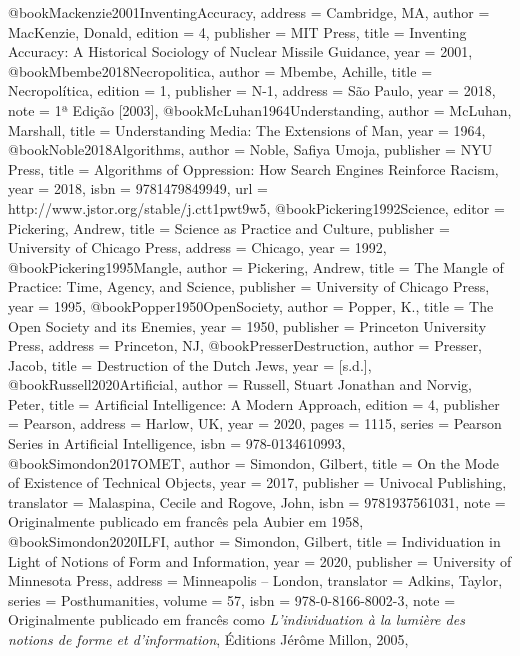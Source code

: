 @book{Mackenzie2001InventingAccuracy,
  address   = {Cambridge, MA},
  author    = {MacKenzie, Donald},
  edition   = {4},
  publisher = {MIT Press},
  title     = {{Inventing Accuracy: A Historical Sociology of Nuclear Missile Guidance}},
  year      = {2001},
}
@book{Mbembe2018Necropolitica,
  author    = {Mbembe, Achille},
  title     = {{Necropolítica}},
  edition   = {1},
  publisher = {N-1},
  address   = {São Paulo},
  year      = {2018},
  note      = {1ª Edição [2003]},
}
@book{McLuhan1964Understanding,
  author    = {McLuhan, Marshall},
  title     = {{Understanding Media: The Extensions of Man}},
  year      = {1964},
}
@book{Noble2018Algorithms,
  author    = {Noble, Safiya Umoja},
  publisher = {NYU Press},
  title     = {{Algorithms of Oppression: How Search Engines Reinforce Racism}},
  year      = {2018},
  isbn      = {9781479849949},
  url       = {http://www.jstor.org/stable/j.ctt1pwt9w5},
}
@book{Pickering1992Science,
  editor    = {Pickering, Andrew},
  title     = {{Science as Practice and Culture}},
  publisher = {University of Chicago Press},
  address   = {Chicago},
  year      = {1992},
}
@book{Pickering1995Mangle,
  author    = {Pickering, Andrew},
  title     = {{The Mangle of Practice: Time, Agency, and Science}},
  publisher = {University of Chicago Press},
  year      = {1995},
}
@book{Popper1950OpenSociety,
  author  = {Popper, K.},
  title   = {{The Open Society and its Enemies}},
  year    = {1950},
  publisher = {Princeton University Press},
  address = {Princeton, NJ},
}
@book{PresserDestruction,
  author    = {Presser, Jacob},
  title     = {{Destruction of the Dutch Jews}},
  year      = {[s.d.]},
}
@book{Russell2020Artificial,
  author    = {Russell, Stuart Jonathan and Norvig, Peter},
  title     = {{Artificial Intelligence: A Modern Approach}},
  edition   = {4},
  publisher = {Pearson},
  address   = {Harlow, UK},
  year      = {2020},
  pages     = {1115},
  series    = {{Pearson Series in Artificial Intelligence}},
  isbn      = {978-0134610993},
}
@book{Simondon2017OMET,
  author    = {Simondon, Gilbert},
  title     = {{On the Mode of Existence of Technical Objects}},
  year      = {2017},
  publisher = {Univocal Publishing},
  translator = {Malaspina, Cecile and Rogove, John},
  isbn      = {9781937561031},
  note      = {Originalmente publicado em francês pela Aubier em 1958},
}
@book{Simondon2020ILFI,
  author    = {Simondon, Gilbert},
  title     = {{Individuation in Light of Notions of Form and Information}},
  year      = {2020},
  publisher = {University of Minnesota Press},
  address   = {Minneapolis -- London},
  translator = {Adkins, Taylor},
  series    = {Posthumanities},
  volume    = {57},
  isbn      = {978-0-8166-8002-3},
  note      = {Originalmente publicado em francês como \textit{L'individuation à la lumière des notions de forme et d'information}, Éditions Jérôme Millon, 2005},
}
